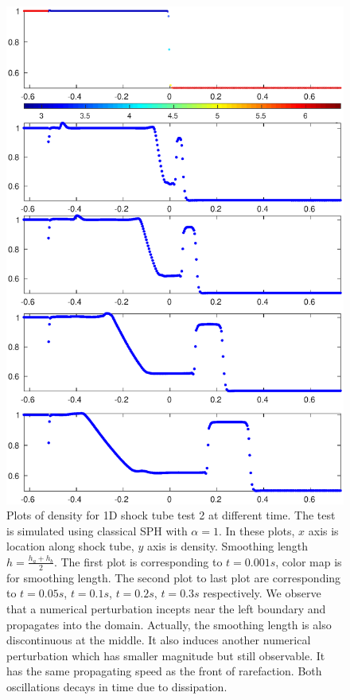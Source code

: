 \documentclass[preprint,12pt,authoryear]{elsarticle}
\begin{document}
\begin{figure}[H]
\centering
\includegraphics[width=0.90 \textwidth]{App-Figure/Perturbation-ME2}
\caption{Plots of density for 1D shock tube test 2 at different time. The test is simulated using classical SPH with $\alpha = 1$. In these plots, $x$ axis is location along shock tube, $y$ axis is density. Smoothing length $h = \frac{h_a + h_b}{2}$. The first plot is corresponding to $t=0.001s$, color map is for smoothing length. The second plot to last plot are corresponding to $t=0.05s$, $t=0.1s$, $t=0.2s$, $t=0.3s$ respectively. We observe that a numerical perturbation incepts near the left boundary and propagates into the domain. Actually, the smoothing length is also discontinuous at the middle. It also induces another numerical perturbation which has smaller magnitude but still observable. It has the same propagating speed as the front of rarefaction. Both oscillations decays in time due to dissipation.}
\label{fig:Perturbation-ME2}
\end{figure}
\end{document}
